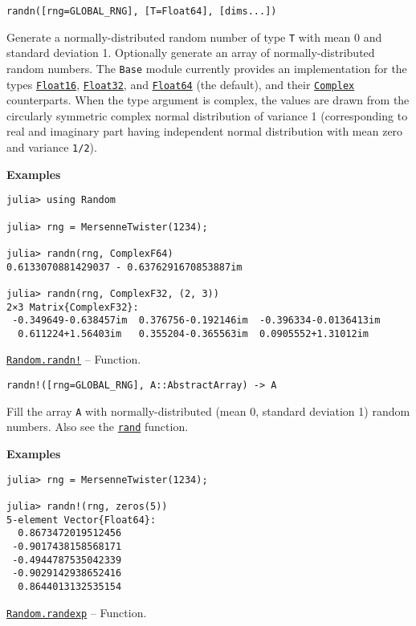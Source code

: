 \begin{adjustwidth}{2em}{0pt}


\begin{verbatim}
randn([rng=GLOBAL_RNG], [T=Float64], [dims...])
\end{verbatim}

Generate a normally-distributed random number of type \texttt{T} with mean 0 and standard deviation 1. Optionally generate an array of normally-distributed random numbers. The \texttt{Base} module currently provides an implementation for the types \hyperlink{2727296760866702904}{\texttt{Float16}}, \hyperlink{8101639384272933082}{\texttt{Float32}}, and \hyperlink{5027751419500983000}{\texttt{Float64}} (the default), and their \hyperlink{11302502367029942782}{\texttt{Complex}} counterparts. When the type argument is complex, the values are drawn from the circularly symmetric complex normal distribution of variance 1 (corresponding to real and imaginary part having independent normal distribution with mean zero and variance \texttt{1/2}).

\textbf{Examples}


\begin{verbatim}
julia> using Random

julia> rng = MersenneTwister(1234);

julia> randn(rng, ComplexF64)
0.6133070881429037 - 0.6376291670853887im

julia> randn(rng, ComplexF32, (2, 3))
2×3 Matrix{ComplexF32}:
 -0.349649-0.638457im  0.376756-0.192146im  -0.396334-0.0136413im
  0.611224+1.56403im   0.355204-0.365563im  0.0905552+1.31012im
\end{verbatim}



\end{adjustwidth}
\hypertarget{15194943605954659727}{}
\hyperlink{15194943605954659727}{\texttt{Random.randn!}}  -- {Function.}

\begin{adjustwidth}{2em}{0pt}


\begin{verbatim}
randn!([rng=GLOBAL_RNG], A::AbstractArray) -> A
\end{verbatim}

Fill the array \texttt{A} with normally-distributed (mean 0, standard deviation 1) random numbers. Also see the \hyperlink{7668863842145012694}{\texttt{rand}} function.

\textbf{Examples}


\begin{verbatim}
julia> rng = MersenneTwister(1234);

julia> randn!(rng, zeros(5))
5-element Vector{Float64}:
  0.8673472019512456
 -0.9017438158568171
 -0.4944787535042339
 -0.9029142938652416
  0.8644013132535154
\end{verbatim}



\end{adjustwidth}
\hypertarget{17131026676213441996}{}
\hyperlink{17131026676213441996}{\texttt{Random.randexp}}  -- {Function.}

